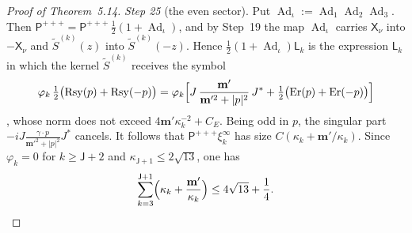 \documentclass[11pt,letterpaper,reqno]{amsart}
\theoremstyle{definition}
\begin{document}
\begin{proof}[Proof of Theorem~5.14]
\emph{Step 25} (the even sector).
Put $\operatorname{Ad}_\iota:=\allowbreak \operatorname{Ad}_1\operatorname{Ad}_2\operatorname{Ad}_3$.
Then $\mathsf P^{+++}=\allowbreak \mathsf P^{+++}\,\allowbreak \frac12(1+\operatorname{Ad}_\iota)$, and by Step~19 the map $\operatorname{Ad}_\iota$ carries $\mathsf X_\nu$ into $-\mathsf X_\nu$ and $\tilde S^{(k)}(z)$ into $\tilde S^{(k)}(-z)$.
Hence $\frac12(1+\operatorname{Ad}_\iota)\mathsf L_k$ is the expression $\mathsf L_k$ in which the kernel $\tilde S^{(k)}$ receives the symbol
\begin{equation*}
\varphi_k\,\tfrac12\bigl(\mathrm{Rsy}(p)+\mathrm{Rsy}(-p)\bigr)=\varphi_k\Bigl[J\,\frac{\mathbf m'}{\mathbf m'^2+|p|^2}\,J^*+\tfrac12\bigl(\mathrm{Er}(p)+\mathrm{Er}(-p)\bigr)\Bigr]
\end{equation*}
\cite[Proposition~37.1\,(f)]{QEDIII}, whose norm does not exceed $4\mathbf m'\kappa_k^{-2}+C_E$.
Being odd in $p$, the singular part $-iJ\frac{\gamma\cdot p}{\mathbf m'^2+|p|^2}J^*$ cancels.
It follows that $\mathsf P^{+++}\xi_k^\infty$ has size $C(\kappa_k+\mathbf m'/\kappa_k)$.
Since $\varphi_k=0$ for $k\ge\mathsf J+2$ and $\kappa_{\mathsf J+1}\le2\sqrt{13}$, one has
\begin{equation*}
\sum_{k=3}^{\mathsf J+1}\Bigl(\kappa_k+\frac{\mathbf m'}{\kappa_k}\Bigr)\le4\sqrt{13}+\frac14.
\end{equation*}


\end{proof}
\end{document}
